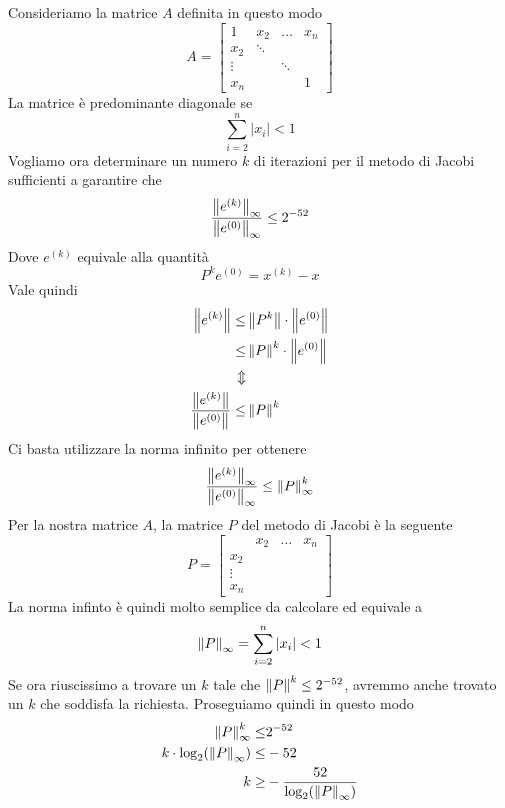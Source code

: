 \begin{example}
	Consideriamo la matrice $A$ definita in questo modo
	\[
		A = \begin{bmatrix}
			1      & x_2    & \dots  & x_n \\
			x_2    & \ddots &        &     \\
			\vdots &        & \ddots &     \\
			x_n    &        &        & 1
		\end{bmatrix}
	\]
	La matrice è predominante diagonale se
	\[ \sum_{i=2}^n |x_i| < 1 \]
	Vogliamo ora determinare un numero $k$ di iterazioni per il metodo di Jacobi sufficienti a garantire che
	\[ \frac{\left\lVert e^{(k)}\right\rVert_\infty}{\left\lVert e^{(0)}\right\rVert_\infty} \leq 2^{-52} \]
	Dove $e^{(k)}$ equivale alla quantità
	\[ P^k e^{(0)} = x^{(k)} - x \]
	Vale quindi
	\begin{align*}
		\left\lVert e^{(k)}\right\rVert  \leq                       & \left\lVert P^k\right\rVert \cdot \left\lVert e^{(0)}\right\rVert \\
		\leq                                       & \left\lVert P\right\rVert^k \cdot \left\lVert e^{(0)}\right\rVert \\
		\Updownarrow                               &                                 \\
		\frac{\left\lVert e^{(k)}\right\rVert}{\left\lVert e^{(0)}\right\rVert} \leq & \left\lVert P\right\rVert^k
	\end{align*}
	Ci basta utilizzare la norma infinito per ottenere
	\[ \frac{\left\lVert e^{(k)}\right\rVert_\infty}{\left\lVert e^{(0)}\right\rVert_\infty} \leq \left\lVert P\right\rVert_\infty^k \]
	Per la nostra matrice $A$, la matrice $P$ del metodo di Jacobi è la seguente
	\[
		P = \begin{bmatrix}
			       & x_2 & \dots & x_n \\
			x_2    &     &       &     \\
			\vdots &     &       &     \\
			x_n    &     &       &
		\end{bmatrix}
	\]
	La norma infinto è quindi molto semplice da calcolare ed equivale a
	\[ \left\lVert P\right\rVert_\infty = \sum_{i=2}^{n} |x_i| < 1 \]
	Se ora riuscissimo a trovare un $k$ tale che $\left\lVert P\right\rVert^k \leq 2^{-52}$, avremmo anche trovato un $k$ che
	soddisfa la richiesta. Proseguiamo quindi in questo modo
	\begin{align*}
		\norm{P}_\infty^k \leq                & 2^{-52}                              \\
		k \cdot \log_2 (\norm{P}_\infty) \leq & -52                                  \\
		k \geq                                & -\frac{52}{\log_2 (\norm{P}_\infty)}

\end{align*}
\end{example}
